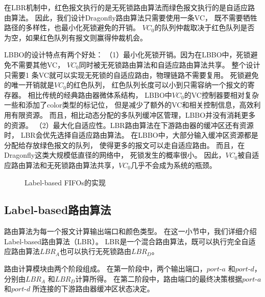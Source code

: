 在LBR机制中，红色报文执行的是无死锁路由算法而绿色报文执行的是自适应路由算法。
因此，我们设计Dragonfly路由算法只需要使用一条VC，
既不需要牺牲路径的多样性，也最小化死锁避免的开销。
$VC_0$的队列仲裁取决于红色队列是否为空，如果红色队列有报文则赢得仲裁机会。

LBBO的设计特点有两个好处：
（1）最小化死锁开销。因为在LBBO中，死锁避免不需要其他VC，
$VC_0$同时被无死锁路由算法和自适应路由算法共享。
整个设计只需要1 条VC就可以实现无死锁的自适应路由，物理链路不需要复用。
死锁避免的唯一开销就是$VC_0$的红色队列，
红色队列长度可以小到只需容纳一个报文的寄存器。
相比传统的经典路由器微体系结构，
LBBO中$VC_0$的VC控制器要相对复杂一些和添加了color类型的标记位，
但是减少了额外的VC和相关控制信息，高效利用有限资源。
而且，相比动态分配的多队列缓冲区管理，LBBO并没有消耗更多的资源。
（2）最大化自适应性。LBR路由算法在下游路由器的缓冲区还有资源时，
LBR会优先选择自适应路由算法。
在LBBO中，大部分输入缓冲区资源都是分配给存放绿色报文的队列，
使得更多的报文可以走自适应路由。
而且，在Dragonfly这类大规模低直径的网络中，
死锁发生的概率很小。
因此，$VC_0$被自适应路由算法和无死锁路由算法共享，$VC_0$几乎不会成为系统的瓶颈。

\begin{figure}[t]
  \centering
  \caption{Label-based FIFOs的实现}
  \label{fig:grbofifos}
\end{figure}

\subsection{Label-based路由算法}

路由算法为每一个报文计算输出端口和颜色类型。
在这一小节中，我们详细介绍Label-based路由算法（LBR）。
LBR是一个混合路由算法，既可以执行完全自适应路由算法$LBR_A$也可以执行无死锁路由$LBR_D$。

路由计算模块由两个阶段组成。
在第一阶段中，两个输出端口，$port\textrm{-}a$ 和$port\textrm{-}d$，
分别由$LBR_A$ 和$LBR_D$计算所得。
在第二阶段中，路由端口的最终决策根据$port\textrm{-}a$和$port\textrm{-}d$
所连接的下游路由器缓冲区状态决定。


